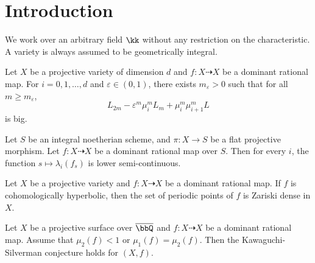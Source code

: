 \section{Introduction}








  We work over an arbitrary field $\kk$ without any restriction on the characteristic.
  A variety is always assumed to be geometrically integral.

  \begin{mainthm}[{= \Yang{}, ref. \cite[Theorem 3.7]{Xie24recursive_inequalities}}]\label{mainthm:recursive_inequality}
    Let $X$ be a projective variety of dimension $d$ and $f: X \dashrightarrow X$ be a dominant rational map.
    For $i = 0, 1, \ldots, d$ and $\varepsilon \in (0, 1)$, there exists $m_\varepsilon > 0$ such that for all $m \geq m_\varepsilon$,
    \[  L_{2m} - \varepsilon^m \mu_i^m L_m + \mu_i^m \mu_{i+1}^m L \]
    is big.
  \end{mainthm}

  \begin{mainthm}[{= \Yang{}, ref. \cite[Theorem 1.8]{Xie24recursive_inequalities}}]\label{mainthm:semi-continuity}
    Let $S$ be an integral noetherian scheme, and $\pi: X \to S$ be a flat projective morphism. 
    Let $f: X \dashrightarrow X$ be a dominant rational map over $S$.
    Then for every $i$, the function $s \mapsto \lambda_i(f_s)$ is lower semi-continuous.
  \end{mainthm}

  \begin{mainthm}[{= \Yang{}, ref. \cite[Theorem 1.12]{Xie24recursive_inequalities}}]\label{mainthm:periodic_points}
    Let $X$ be a projective variety and $f: X \dashrightarrow X$ be a dominant rational map.
    If $f$ is cohomologically hyperbolic, then the set of periodic points of $f$ is Zariski dense in $X$.
  \end{mainthm}

  \begin{mainthm}[{= \Yang{}, ref. \cite[Theorem 1.14]{Xie24recursive_inequalities}}]\label{mainthm:application_to_KSC}
    Let $X$ be a projective surface over $\overline{\bbQ}$ and $f: X \dashrightarrow X$ be a dominant rational map.
    Assume that $\mu_2(f) < 1$ or $\mu_1(f) = \mu_2(f)$.
    Then the Kawaguchi-Silverman conjecture holds for $(X, f)$.
  \end{mainthm}